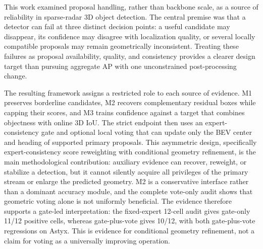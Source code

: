 \documentclass[preprint,12pt,times]{elsarticle}
\begin{document}
This work examined proposal handling, rather than backbone scale, as a source
of reliability in sparse-radar 3D object detection. The central premise was
that a detector can fail at three distinct decision points: a useful candidate
may disappear, its confidence may disagree with localization quality, or
several locally compatible proposals may remain geometrically inconsistent.
Treating these failures as proposal availability, quality, and consistency
provides a clearer design target than pursuing aggregate AP with one
unconstrained post-processing change.

The resulting framework assigns a restricted role to each source of evidence.
M1 preserves borderline candidates, M2 recovers complementary residual boxes
while capping their scores, and M3 trains confidence against a target that
combines objectness with online 3D IoU. The strict endpoint then uses an
expert-consistency gate and optional local voting that can update only the BEV center
and heading of supported primary proposals. This asymmetric design, specifically
expert-consistency score reweighting with conditional geometry refinement, is
the main methodological contribution: auxiliary evidence can recover, reweight,
or stabilize a detection, but it cannot silently acquire all privileges of the
primary stream or enlarge the predicted geometry. M2 is a conservative
interface rather than a dominant accuracy module, and the complete vote-only
audit shows that geometric voting alone is not uniformly beneficial. The
evidence therefore supports a gate-led interpretation: the fixed-expert 12-cell
audit gives gate-only 11/12 positive cells, whereas gate-plus-vote gives 10/12,
with both gate-plus-vote regressions on Astyx. This is evidence for conditional
geometry refinement, not a claim for voting as a universally improving operation.
\end{document}
